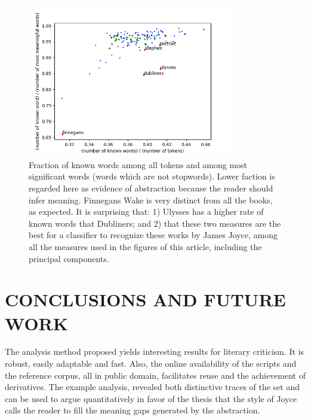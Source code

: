 \documentclass[12pt,fleqn]{article}
\begin{document}
\begin{figure}[!htbp] %
\vspace{-2pt}
\begin{center}
\includegraphics[height=6.7cm,width=9cm]{figs/abst2}%
    \caption{Fraction of known words among all tokens and among most significant words (words which are not stopwords).
    Lower faction is regarded here as evidence of abstraction because the reader should infer meaning.
    Finnegans Wake is very distinct from all the books, as expected.
    It is surprising that: 1) Ulysses has a higher rate of known words that Dubliners; and 2) that these two measures are the best for a classifier to recognize these works by James Joyce, among all the measures used in the figures of this article, including the principal components.}
\label{fig:abst2}%
\end{center}
\end{figure}

\section{CONCLUSIONS AND FUTURE WORK}\label{sec:conc}
The analysis method proposed yields interesting results for literary criticism.
It is robust, easily adaptable and fast.
Also, the online availability of the scripts and the reference corpus,
all in public domain, facilitates reuse and the achievement of derivatives.
The example analysis,
revealed both distinctive traces of the set and can be used to argue quantitatively
in favor of the thesis that the style of Joyce calls the reader to fill the
meaning gaps generated by the abstraction.
\end{document}
